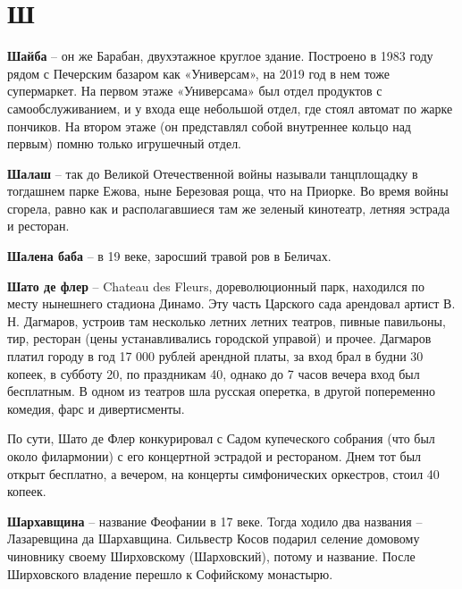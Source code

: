 \chapter*{Ш}

\textbf{Шайба} – он же Барабан, двухэтажное круглое здание. Построено в 1983 году рядом с Печерским базаром как «Универсам», на 2019 год в нем тоже супермаркет. На первом этаже «Универсама» был отдел продуктов с самообслуживанием, и у входа еще небольшой отдел, где стоял автомат по жарке пончиков. На втором этаже (он представлял собой внутреннее кольцо над первым) помню только игрушечный отдел.\\

\medskip

\textbf{Шалаш} – так до Великой Отечественной войны называли танцплощадку в тогдашнем парке Ежова, ныне Березовая роща, что на Приорке. Во время войны сгорела, равно как и располагавшиеся там же зеленый кинотеатр, летняя эстрада и ресторан.\\

\medskip

\textbf{Шалена баба} – в 19 веке, заросший травой ров в Беличах.\\

\medskip

\textbf{Шато де флер} – Chateau des Fleurs, дореволюционный парк, находился по месту нынешнего стадиона Динамо. Эту часть Царского сада арендовал артист В. Н. Дагмаров, устроив там несколько летних летних театров, пивные павильоны, тир, ресторан (цены устанавливались городской управой) и прочее. Дагмаров платил городу в год 17 000 рублей арендной платы, за вход брал в будни 30 копеек, в субботу 20, по праздникам 40, однако до 7 часов вечера вход был бесплатным. В одном из театров шла русская оперетка, в другой попеременно комедия, фарс и дивертисменты.

По сути, Шато де Флер конкурировал с Садом купеческого собрания (что был около филармонии) с его концертной эстрадой и рестораном. Днем тот был открыт бесплатно, а вечером, на концерты симфонических оркестров, стоил 40 копеек.\\ 

\medskip

\textbf{Шархавщина} – название Феофании в 17 веке. Тогда ходило два названия – Лазаревщина да Шархавщина. Сильвестр Косов подарил селение домовому чиновнику своему Ширховскому (Шарховский), потому и название. После Ширховского владение перешло к Софийскому монастырю.\\

